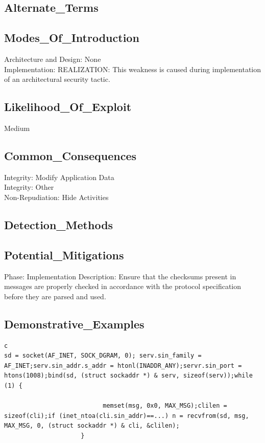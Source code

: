 \subsection*{Alternate\_Terms}
\subsection*{Modes\_Of\_Introduction}
Architecture and Design: None\\
Implementation: REALIZATION: This weakness is caused during implementation of an architectural security tactic.\\
\subsection*{Likelihood\_Of\_Exploit}
Medium

\subsection*{Common\_Consequences}
Integrity: Modify Application Data\\
Integrity: Other\\
Non-Repudiation: Hide Activities\\
\subsection*{Detection\_Methods}
\subsection*{Potential\_Mitigations}
Phase: Implementation
Description: Ensure that the checksums present in messages are properly checked in accordance with the protocol specification before they are parsed and used.\\
\subsection*{Demonstrative\_Examples}
\begin{lstlisting}[breaklines=true,postbreak=\mbox{$\hookrightarrow$\space}]
c
sd = socket(AF_INET, SOCK_DGRAM, 0); serv.sin_family = AF_INET;serv.sin_addr.s_addr = htonl(INADDR_ANY);servr.sin_port = htons(1008);bind(sd, (struct sockaddr *) & serv, sizeof(serv));while (1) {
                        
                           memset(msg, 0x0, MAX_MSG);clilen = sizeof(cli);if (inet_ntoa(cli.sin_addr)==...) n = recvfrom(sd, msg, MAX_MSG, 0, (struct sockaddr *) & cli, &clilen);
                     }
\end{lstlisting}

